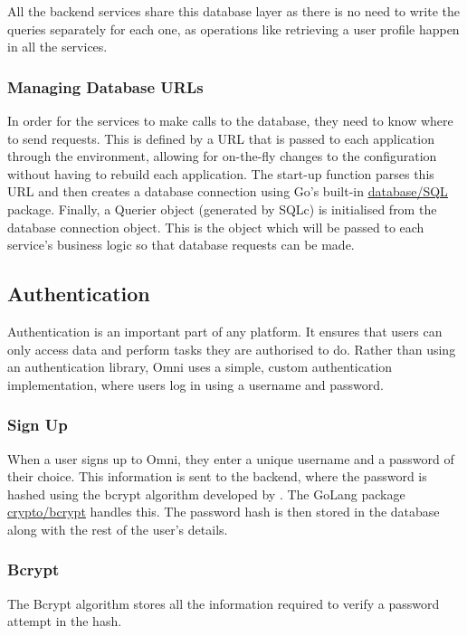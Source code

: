 

All the backend services share this database layer as there is no need to write the queries separately for each one, as operations like retrieving a user profile happen in all the services.

\subsubsection{Managing Database URLs}
In order for the services to make calls to the database, they need to know where to send requests.
This is defined by a URL that is passed to each application through the environment, allowing for on-the-fly changes to the configuration without having to rebuild each application. 
The start-up function parses this URL and then creates a database connection using Go's built-in \underline{\href{https://pkg.go.dev/database/sql}{database/SQL}} \nocite{gosqlpkg} package.
Finally, a Querier object (generated by SQLc) is initialised from the database connection object. This is the object which will be passed to each service's business logic so that database requests can be made.

\subsection{Authentication}
Authentication is an important part of any platform. It ensures that users can only access data and perform tasks they are authorised to do. 
Rather than using an authentication library, Omni uses a simple, custom authentication implementation, where users log in using a username and password.

\subsubsection{Sign Up}
\label{sec:impl-auth-signup}
When a user signs up to Omni, they enter a unique username and a password of their choice.
This information is sent to the backend, where the password is hashed using the bcrypt algorithm developed by \citeauthor{provos1999future}.
The GoLang package \underline{\href{https://pkg.go.dev/golang.org/x/crypto/bcrypt}{crypto/bcrypt}} \nocite{gobcryptpkg} handles this. The password hash is then stored in the database along with the rest of the user's details.

\subsubsection{Bcrypt}
The Bcrypt algorithm stores all the information required to verify a password attempt in the hash.

